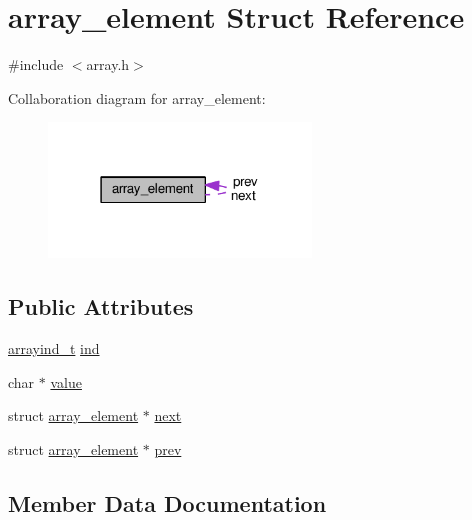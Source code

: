 \hypertarget{structarray__element}{}\section{array\+\_\+element Struct Reference}
\label{structarray__element}


{\ttfamily \#include $<$array.\+h$>$}



Collaboration diagram for array\+\_\+element\+:
\nopagebreak
\begin{figure}[H]
\begin{center}
\leavevmode
\includegraphics[width=198pt]{structarray__element__coll__graph}
\end{center}
\end{figure}
\subsection*{Public Attributes}
\begin{DoxyCompactItemize}
\item 
\hyperlink{array_8h_a3672e3c5b95dde98c9ed75ac7c1e6d60}{arrayind\+\_\+t} \hyperlink{structarray__element_a5b124be3fa60c35575c578eff8110a2d}{ind}
\item 
char $\ast$ \hyperlink{structarray__element_aa4bea33277d92a610382ad78a1ca765d}{value}
\item 
struct \hyperlink{structarray__element}{array\+\_\+element} $\ast$ \hyperlink{structarray__element_a4da2f65f567163c403ec1bbe61860c0f}{next}
\item 
struct \hyperlink{structarray__element}{array\+\_\+element} $\ast$ \hyperlink{structarray__element_a065d6ae08152f864cf45e662e1a7ffec}{prev}
\end{DoxyCompactItemize}


\subsection{Member Data Documentation}
